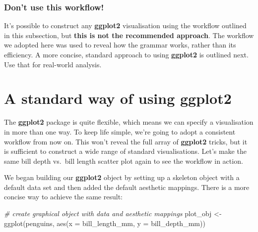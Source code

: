 \documentclass[
]{book}
\newenvironment{Shaded}{\begin{snugshade}}{\end{snugshade}}
\newcommand{\AttributeTok}[1]{\textcolor[rgb]{0.77,0.63,0.00}{#1}}
\newcommand{\CommentTok}[1]{\textcolor[rgb]{0.56,0.35,0.01}{\textit{#1}}}
\newcommand{\FunctionTok}[1]{\textcolor[rgb]{0.00,0.00,0.00}{#1}}
\newcommand{\NormalTok}[1]{#1}
\newcommand{\OtherTok}[1]{\textcolor[rgb]{0.56,0.35,0.01}{#1}}
\newenvironment{greybox}{
  \definecolor{shadecolor}{rgb}{0.95,0.95,0.95}  %
  \color{black}
  \begin{shaded}}
 {\end{shaded}}
\newenvironment{infobox}[1]
  {
  \begin{itemize}
  \renewcommand{\labelitemi}{
    \raisebox{-.7\height}[0pt][0pt]{
      {\setkeys{Gin}{width=3em,keepaspectratio}
        \texttt{[image: images/\#1]}}
    }
  }
  \setlength{\fboxsep}{1em}
  \begin{greybox}
  \item
  }
  {
  \end{greybox}
  \end{itemize}
  }
\begin{document}
\begin{infobox}{warning}

\hypertarget{dont-use-this-workflow}{%
\subsubsection*{Don't use this workflow!}\label{dont-use-this-workflow}}

It's possible to construct any \textbf{ggplot2} visualisation using the workflow outlined in this subsection, but \textbf{this is not the recommended approach}. The workflow we adopted here was used to reveal how the grammar works, rather than its efficiency. A more concise, standard approach to using \textbf{ggplot2} is outlined next. Use that for real-world analysis.

\end{infobox}

\hypertarget{a-standard-way-of-using-ggplot2}{%
\section{\texorpdfstring{A standard way of using \textbf{ggplot2}}{A standard way of using ggplot2}}\label{a-standard-way-of-using-ggplot2}}

The \textbf{ggplot2} package is quite flexible, which means we can specify a visualisation in more than one way. To keep life simple, we're going to adopt a consistent workflow from now on. This won't reveal the full array of \textbf{ggplot2} tricks, but it is sufficient to construct a wide range of standard visualisations. Let's make the same bill depth vs.~bill length scatter plot again to see the workflow in action.

We began building our \textbf{ggplot2} object by setting up a skeleton object with a default data set and then added the default aesthetic mappings. There is a more concise way to achieve the same result:

\begin{Shaded}
\begin{Highlighting}[]
\CommentTok{\# create graphical object with data and aesthetic mappings}
\NormalTok{plot\_obj }\OtherTok{\textless{}{-}} \FunctionTok{ggplot}\NormalTok{(penguins, }\FunctionTok{aes}\NormalTok{(}\AttributeTok{x =}\NormalTok{ bill\_length\_mm, }\AttributeTok{y =}\NormalTok{ bill\_depth\_mm))}
\end{Highlighting}
\end{Shaded}
\end{document}
